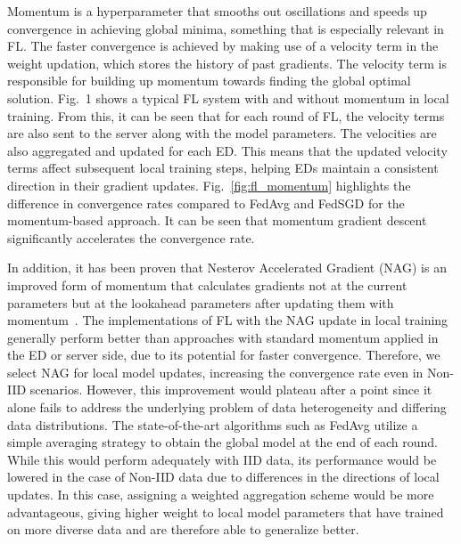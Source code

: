 \documentclass[journal]{IEEEtran}
\begin{document}
Momentum is a hyperparameter that smooths out oscillations and speeds up convergence in achieving global minima, something that is especially relevant in FL. The faster convergence is achieved by making use of a velocity term in the weight updation, which stores the history of past gradients. The velocity term is responsible for building up momentum towards finding the global optimal solution. Fig.~1 shows a typical FL system with and without momentum in local training. From this, it can be seen that for each round of FL, the velocity terms are also sent to the server along with the model parameters. The velocities are also aggregated and updated for each ED. This means that the updated velocity terms affect subsequent local training steps, helping EDs maintain a consistent direction in their gradient updates. Fig.~\ref{fig:fl_momentum} highlights the difference in convergence rates compared to FedAvg and FedSGD for the momentum-based approach. It can be seen that momentum gradient descent significantly accelerates the convergence rate.

In addition, it has been proven that Nesterov Accelerated Gradient (NAG) is an improved form of momentum that calculates gradients not at the current parameters but at the lookahead parameters after updating them with momentum~\cite{nesterov-intro}. The implementations of FL with the NAG update in local training~\cite{fednag} generally perform better than approaches with standard momentum applied in the ED or server side, due to its potential for faster convergence. Therefore, we select NAG for local model updates, increasing the convergence rate even in Non-IID scenarios. However, this improvement would plateau after a point since it alone fails to address the underlying problem of data heterogeneity and differing data distributions. The state-of-the-art algorithms such as FedAvg utilize a simple averaging strategy to obtain the global model at the end of each round. While this would perform adequately with IID data, its performance would be lowered in the case of Non-IID data due to differences in the directions of local updates. In this case, assigning a weighted aggregation scheme would be more advantageous, giving higher weight to local model parameters that have trained on more diverse data and are therefore able to generalize better. 
\end{document}

